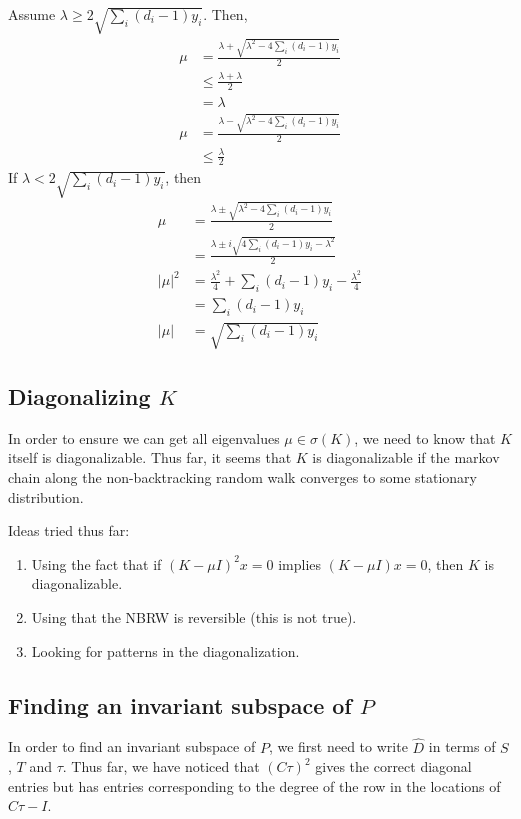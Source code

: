 \documentclass[11pt]{article}
\begin{document}
Assume $\lambda\geq2\sqrt{\sum_i(d_i-1)y_i}$.
Then,
\begin{align}
    \mu &= \frac{\lambda+\sqrt{\lambda^2-4\sum_i(d_i-1)y_i}}{2}\\
    &\leq \frac{\lambda+\lambda}{2}\\&=\lambda\\
    \mu&=\frac{\lambda-\sqrt{\lambda^2-4\sum_i(d_i-1)y_i}}{2}\\
    &\leq \frac{\lambda}{2}
\end{align}
If $\lambda < 2\sqrt{\sum_i(d_i-1)y_i}$, then
\begin{align}
    \mu&=\frac{\lambda\pm\sqrt{\lambda^2-4\sum_i(d_i-1)y_i}}{2}\\
    &=\frac{\lambda\pm i\sqrt{4\sum_i(d_i-1)y_i-\lambda^2}}{2}\\
    |\mu|^2&=\frac{\lambda^2}{4}+\sum_i(d_i-1)y_i-\frac{\lambda^2}{4}\\
    &=\sum_i(d_i-1)y_i\\
    |\mu|&=\sqrt{\sum_i(d_i-1)y_i}
\end{align}

\subsection{Diagonalizing $K$}

In order to ensure we can get all eigenvalues $\mu\in\sigma(K)$, we need to know that $K$ itself is diagonalizable.
Thus far, it seems that $K$ is diagonalizable if the markov chain along the non-backtracking random walk converges to some stationary distribution.

Ideas tried thus far:
\begin{enumerate}
\item Using the fact that if $(K-\mu I)^2x=0$ implies $(K-\mu I)x=0$, then $K$ is diagonalizable.
\item Using that the NBRW is reversible (this is not true).
\item Looking for patterns in the diagonalization.
\end{enumerate}

\subsection{Finding an invariant subspace of $P$}

In order to find an invariant subspace of $P$, we first need to write $\hat{D}$ in terms of $S$, $T$ and $\tau$. Thus far, we have noticed that $(C\tau)^2$ gives the correct diagonal entries but has entries corresponding to the degree of the row in the locations of $C\tau-I$.
\end{document}
